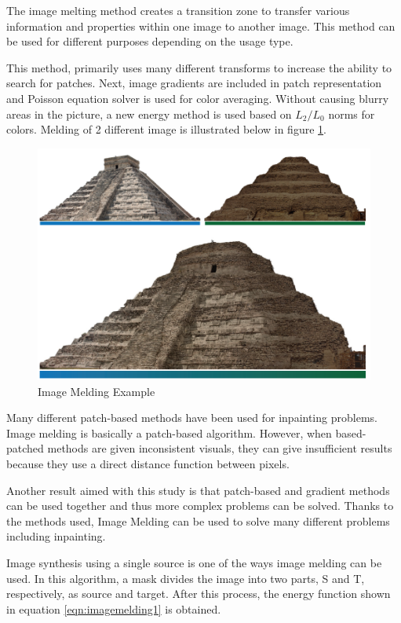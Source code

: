 The image melting method \cite{imagemelding} creates a transition zone to transfer various information and properties within one image to another image. This method can be used for different purposes depending on the usage type.

This method, primarily uses many different transforms to increase the ability to search for patches. Next, image gradients are included in patch representation and Poisson equation solver is used for color averaging. Without causing blurry areas in the picture, a new energy method is used based on \(L_2/L_0\) norms for colors. Melding of 2 different image is illustrated below in figure \ref{fig:image-melding-example}.

\begin{figure}[h]
    \centering
    \includegraphics{figures/chapter2/Image-Melding.png}
    \caption{Image Melding Example}
    \label{fig:image-melding-example}
\end{figure}

Many different patch-based methods have been used for inpainting problems. Image melding is basically a patch-based algorithm. However, when based-patched methods are given inconsistent visuals, they can give insufficient results because they use a direct distance function between pixels.

Another result aimed with this study is that patch-based and gradient methods can be used together and thus more complex problems can be solved. Thanks to the methods used, Image Melding can be used to solve many different problems including inpainting.

Image synthesis using a single source is one of the ways image melding can be used. In this algorithm, a mask divides the image into two parts, S and T, respectively, as source and target. After this process, the energy function shown in equation \ref{eqn:imagemelding1} is obtained.


